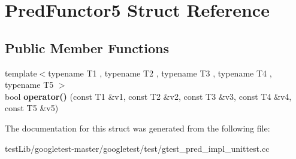 \hypertarget{structPredFunctor5}{}\section{Pred\+Functor5 Struct Reference}
\label{structPredFunctor5}
\subsection*{Public Member Functions}
\begin{DoxyCompactItemize}
\item 
\mbox{\label{structPredFunctor5_af9decf4d509848479ccdc4fe90129a06}} 
{\footnotesize template$<$typename T1 , typename T2 , typename T3 , typename T4 , typename T5 $>$ }\\bool {\bfseries operator()} (const T1 \&v1, const T2 \&v2, const T3 \&v3, const T4 \&v4, const T5 \&v5)
\end{DoxyCompactItemize}


The documentation for this struct was generated from the following file\+:\begin{DoxyCompactItemize}
\item 
test\+Lib/googletest-\/master/googletest/test/gtest\+\_\+pred\+\_\+impl\+\_\+unittest.\+cc\end{DoxyCompactItemize}
